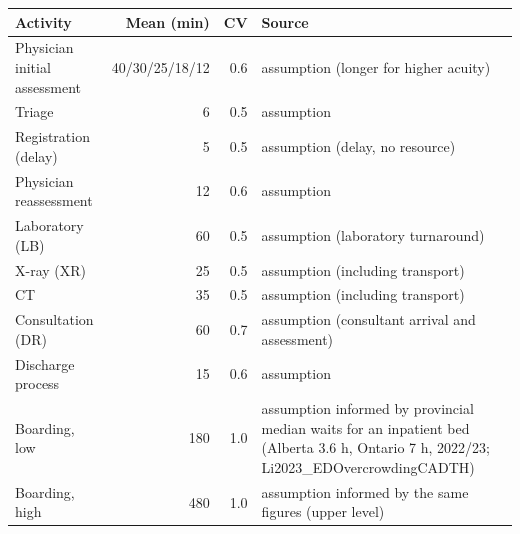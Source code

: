 \begin{tabular}{lrrp{6.6cm}}
\toprule
Activity & Mean (min) & CV & Source \\
\midrule
Physician initial assessment & 40/30/25/18/12 & 0.6 & assumption (longer for higher acuity) \\
Triage & 6 & 0.5 & assumption \\
Registration (delay) & 5 & 0.5 & assumption (delay, no resource) \\
Physician reassessment & 12 & 0.6 & assumption \\
Laboratory (LB) & 60 & 0.5 & assumption (laboratory turnaround) \\
X-ray (XR) & 25 & 0.5 & assumption (including transport) \\
CT & 35 & 0.5 & assumption (including transport) \\
Consultation (DR) & 60 & 0.7 & assumption (consultant arrival and assessment) \\
Discharge process & 15 & 0.6 & assumption \\
Boarding, low & 180 & 1.0 & assumption informed by provincial median waits for an inpatient bed (Alberta 3.6 h, Ontario 7 h, 2022/23; Li2023\_EDOvercrowdingCADTH) \\
Boarding, high & 480 & 1.0 & assumption informed by the same figures (upper level) \\
\bottomrule
\end{tabular}
